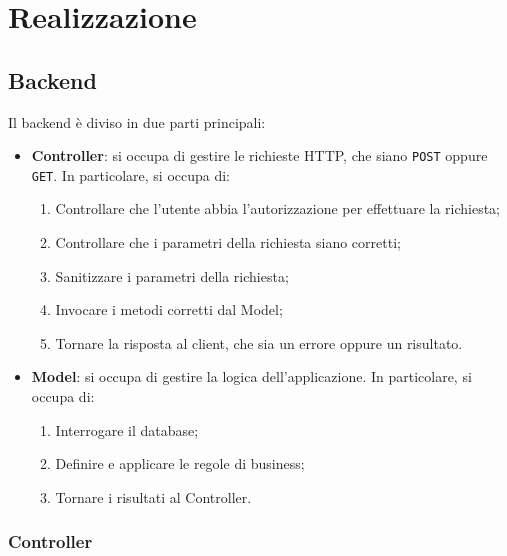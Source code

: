 \section{Realizzazione}

\subsection{Backend}

Il backend è diviso in due parti principali:
\begin{itemize}
	\item \textbf{Controller}: si occupa di gestire le richieste HTTP, che siano
		\texttt{POST} oppure \texttt{GET}. In particolare, si occupa di:
		\begin{enumerate}
			\item Controllare che l'utente abbia l'autorizzazione per effettuare la 
				richiesta;

			\item Controllare che i parametri della richiesta siano corretti;

			\item Sanitizzare i parametri della richiesta;

			\item Invocare i metodi corretti dal Model;

			\item Tornare la risposta al client, che sia un errore oppure un 
				risultato.
		\end{enumerate}

	\item \textbf{Model}: si occupa di gestire la logica dell'applicazione. In 
		particolare, si occupa di:
		\begin{enumerate}
			\item Interrogare il database;

			\item Definire e applicare le regole di business;

			\item Tornare i risultati al Controller.
		\end{enumerate}
\end{itemize}

\subsubsection{Controller}

